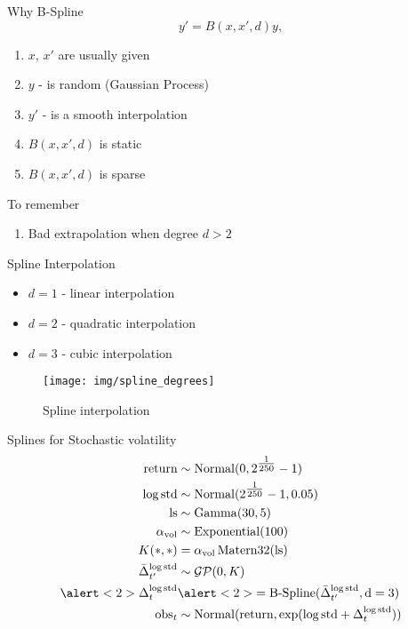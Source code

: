 \documentclass{beamer}
\begin{document}
\begin{frame}{Why B-Spline}
\begin{equation*}
    y' = B(x, x', d) y,
\end{equation*}
    \begin{enumerate}
        \item $x$, $x'$ are usually given
        \item $y$ - is random (Gaussian Process)
        \item $y'$ - is a smooth interpolation
        \item $B(x, x', d)$ is static
        \item $B(x, x', d)$ is sparse
    \end{enumerate}
\begin{alertblock}{To remember}
    \begin{enumerate}
        \item Bad extrapolation when degree $d > 2$
    \end{enumerate}
\end{alertblock}
\end{frame}
\begin{frame}{Spline Interpolation}
\begin{itemize}
    \item $d=1$  - linear interpolation
    \item $d=2$  - quadratic interpolation
    \item $d=3$  - cubic interpolation
\end{itemize}
\begin{figure}
    \centering
    \texttt{[image: img/spline\_degrees]}
    \caption{Spline interpolation}
\end{figure}
\end{frame}
\begin{frame}{Splines for Stochastic volatility}
    \begin{align*}
        \text{return} & \sim \operatorname{Normal}(0, 2^{\tfrac{1}{250}}-1)\\
        \log\text{std}& \sim \operatorname{Normal}(2^{\tfrac{1}{250}}-1, 0.05)\\
        \text{ls} & \sim \operatorname{Gamma}(30, 5) \\
        \alpha_{\text{vol}} & \sim \operatorname{Exponential}(100)\\
        K(*, *) & = \alpha_{\text{vol}} \operatorname{Matern32}(\text{ls})\\
        \bar\Delta_{t'}^{\log \text{std}} &\sim \mathcal{GP}(0, K)\\
        \alert<2>{\Delta_{t}^{\log \text{std}}} & \alert<2>{= \operatorname{B-Spline}(\bar\Delta_{t'}^{\log \text{std}}, \text{d}=3)}\\
        \text{obs}_t &\sim \operatorname{Normal}(\text{return}, \exp(\log \text{std} + \Delta_t^{\log \text{std}}))
    \end{align*}
\end{frame}
\end{document}
